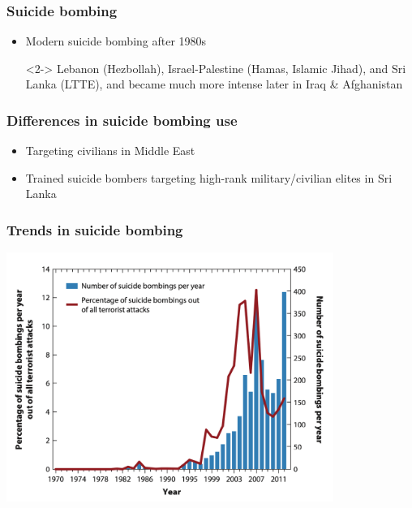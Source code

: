 \documentclass[aspectratio=43]{beamer}
\begin{document}
\begin{frame}
\end{frame}


\begin{frame}
\frametitle{Suicide bombing}
\centering

\begin{itemize}
  \item Modern suicide bombing after 1980s
  \item[]<2-> Lebanon (Hezbollah), Israel-Palestine (Hamas, Islamic Jihad), and Sri Lanka (LTTE), and became much more intense later in Iraq \& Afghanistan
\end{itemize}

\end{frame}


\begin{frame}
\frametitle{Differences in suicide bombing use}
\centering

\begin{itemize}[<+->]
  \item Targeting civilians in Middle East
  \item Trained suicide bombers targeting high-rank military/civilian elites in Sri Lanka
\end{itemize}

\end{frame}


\begin{frame}
\frametitle{Trends in suicide bombing}
\centering

\includegraphics[width = 0.8\textwidth]{img/suicide_bombing_arps}

\end{frame}
\end{document}
